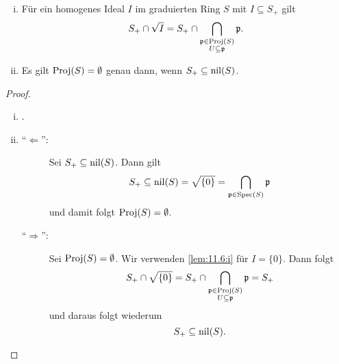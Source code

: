 \begin{lem}
\label{lem:11.6}
	\begin{enumerate}[i)]
		\item\label{lem:11.6:i} Für ein homogenes Ideal $I$ im graduierten Ring $S$ mit $I \subseteq S_+$ gilt
		\[
			S_+ \cap \sqrt{I} = S_+ \cap \bigcap_{\substack{\mathfrak{p} \in \operatorname{Proj}(S)\\U\subseteq\mathfrak{p}}}\mathfrak{p}.
		\]
		\item\label{lem:11.6:ii} Es gilt $\operatorname{Proj}(S) = \emptyset$ genau dann, wenn $S_+\subseteq \operatorname{nil}(S)$.
	\end{enumerate}
	\begin{proof}
		\begin{enumerate}[i)]
			\item \cite[Proposition~13.2~(3)]{goertz2010algebraic}.
			\item \begin{description}
				\item[\enquote{$\Leftarrow$}:] Sei $S_+\subseteq \operatorname{nil}(S)$. Dann gilt
				\[
					S_+ \subseteq \operatorname{nil}(S) = \sqrt{\{0\}} = \bigcap_{\mathfrak{p}\in \operatorname{Spec}(S)}\mathfrak{p}
				\]
				und damit folgt $\operatorname{Proj}(S) = \emptyset$.
				\item[\enquote{$\Rightarrow$}:] Sei $\operatorname{Proj}(S) = \emptyset$. Wir verwenden \ref{lem:11.6:i} für $I=\{0\}$. Dann folgt
				\[
					S_+\cap \sqrt{\{0\}} = S_+ \cap \bigcap_{\substack{\mathfrak{p} \in \operatorname{Proj}(S)\\U\subseteq\mathfrak{p}}}\mathfrak{p} = S_+
				\]
				und daraus folgt wiederum
				\[
					S_+ \subseteq \operatorname{nil}(S).
				\]
			\end{description}
		\end{enumerate}
	\end{proof}
\end{lem}

